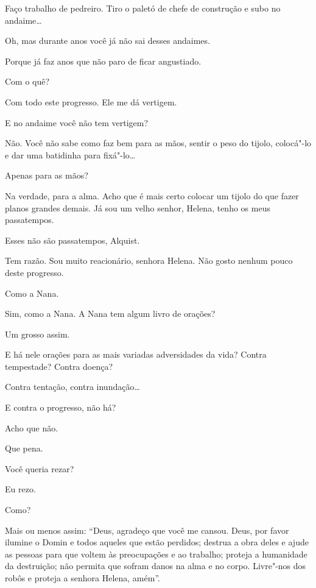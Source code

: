  Faço trabalho de pedreiro. Tiro o paletó de chefe de construção e subo
no andaime\ldots{}

 Oh, mas durante anos você já não sai desses andaimes.

 Porque já faz anos que não paro de ficar angustiado.

 Com o quê?

 Com todo este progresso. Ele me dá vertigem.

 E no andaime você não tem vertigem?

 Não. Você não sabe como faz bem para as mãos, sentir o peso do tijolo,
colocá"-lo e dar uma batidinha para fixá"-lo\ldots{} 

 Apenas para as mãos?

 Na verdade, para a alma. Acho que é mais certo colocar um
tijolo do que fazer planos grandes demais. Já sou um velho senhor, Helena, tenho
os meus passatempos.

 Esses não são passatempos, Alquist.

 Tem razão. Sou muito reacionário, senhora Helena. Não gosto nenhum
pouco deste progresso.

 Como a Nana.

 Sim, como a Nana. A Nana tem algum livro de orações?

 Um grosso assim.

 E há nele orações para as mais variadas adversidades da vida? Contra tempestade?
Contra doença?

 Contra tentação, contra inundação\ldots{}

 E contra o progresso, não há?

 Acho que não.

 Que pena.

 Você queria rezar?

 Eu rezo.

 Como?

 Mais ou menos assim: ``Deus, agradeço que você me cansou. Deus, por
favor ilumine o Domin e todos aqueles que estão perdidos; destrua a obra deles e
ajude as pessoas para que voltem às preocupações e ao trabalho; proteja a
humanidade da destruição; não permita que sofram danos na alma e no corpo.
Livre"-nos dos robôs e proteja a senhora Helena, amém''.

